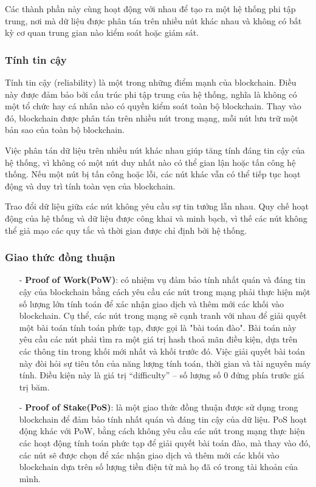 Các thành phần này cùng hoạt động với nhau để tạo ra một hệ thống phi tập trung, 
nơi mà dữ liệu được phân tán trên nhiều nút khác nhau và không có bất kỳ cơ quan 
trung gian nào kiểm soát hoặc giám sát.

\subsubsection{Tính tin cậy}
Tính tin cậy (reliability) là một trong những điểm mạnh của blockchain. Điều 
này được đảm bảo bởi cấu trúc phi tập trung của hệ thống, nghĩa là không có 
một tổ chức hay cá nhân nào có quyền kiểm soát toàn bộ blockchain. Thay vào đó, 
blockchain được phân tán trên nhiều nút trong mạng, mỗi nút lưu trữ một bản sao 
của toàn bộ blockchain.

Việc phân tán dữ liệu trên nhiều nút khác nhau giúp tăng tính đáng tin cậy của 
hệ thống, vì không có một nút duy nhất nào có thể gian lận hoặc tấn công hệ 
thống. Nếu một nút bị tấn công hoặc lỗi, các nút khác vẫn có thể tiếp tục 
hoạt động và duy trì tính toàn vẹn của blockchain.

Trao đổi dữ liệu giữa các nút không yêu cầu sự tin tưởng lẫn nhau. Quy chế 
hoạt động của hệ thống và dữ liệu được công khai 
và minh bạch, vì thế các nút không thể giả mạo các quy tắc và thời gian được 
chỉ định bởi hệ thống.
\subsubsection{Giao thức đồng thuận}
\begin{itemize}
    \item[-] \textbf{Proof of Work(PoW)}: có nhiệm vụ đảm bảo 
    tính nhất quán và đáng tin cậy của blockchain bằng cách yêu cầu các nút 
    trong mạng phải thực hiện một số lượng lớn tính toán để xác nhận giao dịch
    và thêm mới các khối vào blockchain. Cụ thể, các nút trong mạng sẽ cạnh 
    tranh với nhau để giải quyết một bài toán tính toán phức tạp, được gọi là 
    "bài toán đào". Bài toán này yêu cầu các nút phải tìm ra một giá trị hash 
    thoả mãn điều kiện, dựa trên các thông tin trong khối mới nhất và khối trước đó. 
    Việc giải quyết bài toán này đòi hỏi sự tiêu tốn của năng lượng tính toán, 
    thời gian và tài nguyên máy tính. Điều kiện này là giá trị “difficulty” – 
    số lượng số 0 đứng phía trước giá trị băm.
    \item[-] \textbf{Proof of Stake(PoS)}: là một giao thức đồng thuận được sử 
    dụng trong blockchain để đảm bảo tính nhất quán và đáng tin cậy của dữ 
    liệu. PoS hoạt động khác với PoW, bằng cách không yêu cầu các nút trong 
    mạng thực hiện các hoạt động tính toán phức tạp để giải quyết bài toán đào, 
    mà thay vào đó, các nút sẽ được chọn để xác nhận giao dịch và thêm mới các 
    khối vào blockchain dựa trên số lượng tiền điện tử mà họ đã có trong tài 
    khoản của mình.
    
\end{itemize}


